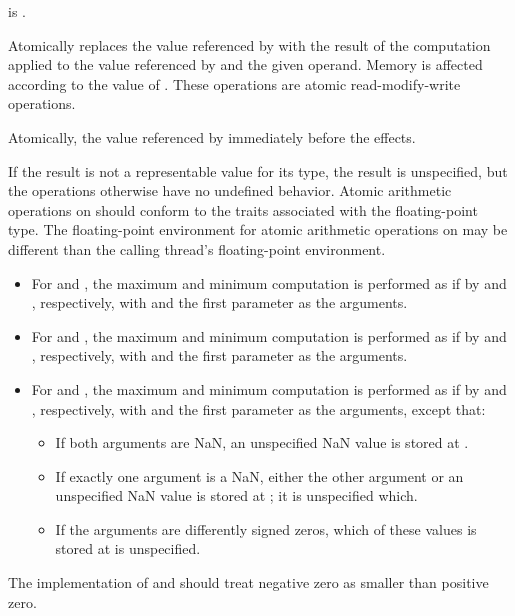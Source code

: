 \begin{itemdescr}
\pnum
\constraints
{} is .

\pnum
\effects
Atomically replaces the value referenced by  with
the result of the computation applied to the value referenced by 
and the given operand.
Memory is affected according to the value of .
These operations are atomic read-modify-write operations.

\pnum
\returns
Atomically, the value referenced by 
immediately before the effects.

\pnum
\remarks
If the result is not a representable value for its type,
the result is unspecified,
but the operations otherwise have no undefined behavior.
Atomic arithmetic operations on  should conform to
the  traits
associated with the floating-point type.
The floating-point environment
for atomic arithmetic operations on 
may be different than the calling thread's floating-point environment.

\pnum
\begin{itemize}
\item
For  and ,
the maximum and minimum computation is performed
as if by  and , respectively,
with  and the first parameter as the arguments.
\item
For  and ,
the maximum and minimum computation is performed
as if by  and , respectively,
with  and the first parameter as the arguments.
\item
For  and ,
the maximum and minimum computation is performed
as if by  and , respectively,
with  and the first parameter as the arguments, except that:
\begin{itemize}
\item
If both arguments are NaN, an unspecified NaN value is stored at .
\item
If exactly one argument is a NaN,
either the other argument or an unspecified NaN value is stored at ;
it is unspecified which.
\item
If the arguments are differently signed zeros,
which of these values is stored at  is unspecified.
\end{itemize}
\end{itemize}

\pnum
\recommended
The implementation of  and 
should treat negative zero as smaller than positive zero.
\end{itemdescr}

